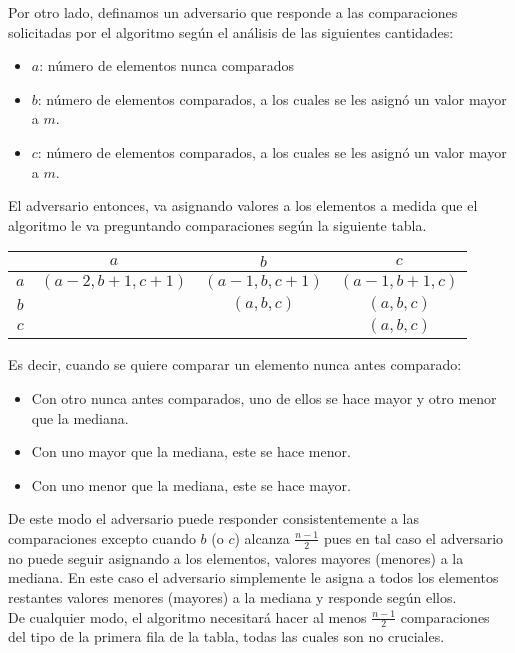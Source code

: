\documentclass[dcc,uchile]{fcfmcourse}
\theoremstyle{plain}
\theoremstyle{definition}
\begin{document}
\begin{problems}
\begin{enumerate}[a)]
    Por otro lado, definamos un adversario que responde a las comparaciones solicitadas por el algoritmo según el análisis de las siguientes cantidades:
    \begin{itemize}
        \item $a$: número de elementos nunca comparados
        \item $b$: número de elementos comparados, a los cuales se les asignó un valor mayor a $m$.
        \item $c$: número de elementos comparados, a los cuales se les asignó un valor mayor a $m$.
    \end{itemize}
    El adversario entonces, va asignando valores a los elementos a medida que el algoritmo le va preguntando comparaciones según la siguiente tabla.\\
    \begin{center}
    \begin{tabular}{|c|c|c|c|}
    \hline
        & $a$ & $b$ & $c$ \\
    \hline
    $a$ & $(a-2,b+1,c+1)$ & $(a-1,b,c+1)$ & $(a-1,b+1,c)$ \\
    \hline
    $b$ & & $(a,b,c)$ & $(a,b,c)$ \\
    \hline
    $c$ & & & $(a,b,c)$ \\
    \hline
    \end{tabular}
    \end{center}
    Es decir, cuando se quiere comparar un elemento nunca antes comparado:
    \begin{itemize}
        \item Con otro nunca antes comparados, uno de ellos se hace mayor y otro menor que la mediana.
        \item Con uno mayor que la mediana, este se hace menor.
        \item Con uno menor que la mediana, este se hace mayor.
    \end{itemize}
    De este modo el adversario puede responder consistentemente a las comparaciones excepto cuando $b$ (o $c$) alcanza $\frac{n-1}{2}$ pues en tal caso el adversario no puede seguir asignando a los elementos, valores mayores (menores) a la mediana. En este caso el adversario simplemente le asigna a todos los elementos restantes valores menores (mayores) a la mediana y responde según ellos.\\
    De cualquier modo, el algoritmo necesitará hacer al menos $\frac{n-1}{2}$ comparaciones del tipo de la primera fila de la tabla, todas las cuales son no cruciales.
\end{enumerate}

\end{problems}
\end{document}
